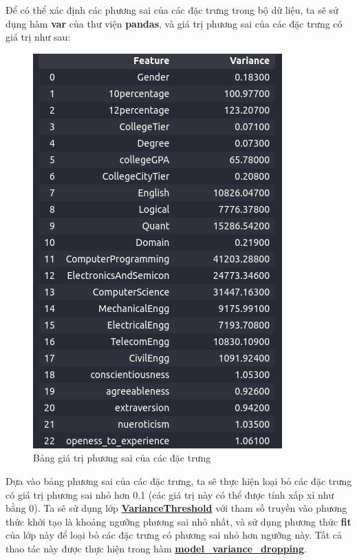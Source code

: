 \documentclass{report}
\begin{document}
    Để có thể xác định các phương sai của các đặc trưng trong bộ dữ liệu, ta sẽ sử dụng hàm \textbf{var} của thư viện \textbf{pandas}, và giá trị phương sai của các đặc trưng có giá trị như sau: 

    \begin{figure}[H]
        \includegraphics[width=\textwidth, height=0.5\textheight, keepaspectratio]{assets/variance.png}
        \centering
        \caption{Bảng giá trị phương sai của các đặc trưng}
    \end{figure}

    
    Dựa vào bảng phương sai của các đặc trưng, ta sẽ thực hiện loại bỏ các đặc trưng có giá trị phương sai nhỏ hơn 0.1 (các giá trị này có thể được tính xấp xỉ như bằng 0). Ta sẽ sử dụng lớp \hyperref[sec:library]{\textbf{VarianceThreshold}} với tham số  truyền vào phương thức khởi tạo là khoảng ngưỡng phương sai nhỏ nhất, và sử dụng phương thức \textbf{fit} của lớp này để loại bỏ các đặc trưng có phương sai nhỏ hơn ngưỡng này. Tất cả thao tác này được thực hiện trong hàm \hyperref[sec:droping-constant-feature]{\textbf{model\_variance\_dropping}}. \\
    
\end{document}
